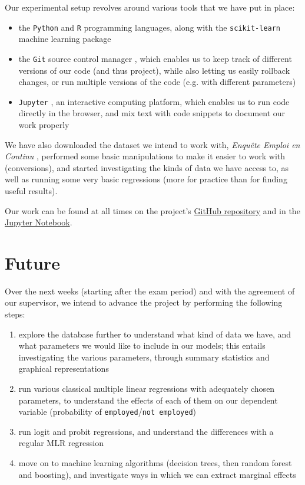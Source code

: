 \documentclass[a4paper]{article}
\begin{document}
Our experimental setup revolves around various tools that we have put in place:
\begin{itemize}
    \item the \texttt{Python} and \texttt{R} programming languages, along with the
\texttt{scikit-learn} machine learning package \cite{python}\cite{R}\cite{learn}
    \item the \texttt{Git} source control manager \cite{git}, which enables us to keep track of
different versions of our code (and thus project), while also letting us easily rollback changes,
or run multiple versions of the code (e.g. with different parameters)
    \item \texttt{Jupyter} \cite{jupyter}, an interactive computing platform, which enables us to
run code directly in the browser, and mix text with code snippets to document our work properly
\end{itemize}

We have also downloaded the dataset we intend to work with, \emph{Enqu\^ete Emploi en Continu}
\cite{enquete}, performed some basic manipulations to make it easier to work with (conversions), and
started investigating the kinds of data we have access to, as well as running some very basic
regressions (more for practice than for finding useful results).

Our work can be found at all times on the project's
\href{https://github.com/ncocacola/econml/}{GitHub repository} and in the
\href{https://github.com/ncocacola/econml/blob/master/econml.ipynb}{Jupyter Notebook}.

\section{Future} Over the next weeks (starting after the exam period) and with the agreement of our
supervisor, we intend to advance the project by performing the following steps:
\begin{enumerate}
    \item explore the database further to understand what kind of data we have, and what parameters
we would like to include in our models; this entails investigating the various parameters, through
summary statistics and graphical representations
    \item run various classical multiple linear regressions with adequately chosen parameters, to
understand the effects of each of them on our dependent variable (probability of
\texttt{employed}/\texttt{not employed})
    \item run logit and probit regressions, and understand the differences with a regular MLR
regression
    \item move on to machine learning algorithms (decision trees, then random forest and boosting),
and investigate ways in which we can extract marginal effects \end{enumerate}
\end{document}
